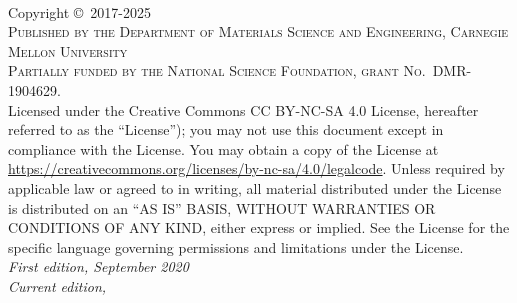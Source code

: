 
\newpage
~\vfill
\thispagestyle{empty}

\noindent Copyright \copyright\ 2017-2025\\ %

\noindent \textsc{Published by the Department of Materials Science and Engineering, Carnegie Mellon University}\\ %

\noindent \textsc{Partially funded by the National Science Foundation, grant No.\ DMR-1904629.}\\ 


\noindent Licensed under the Creative Commons CC BY-NC-SA 4.0 License, hereafter referred to as the ``License''); you may not
use this document except in compliance with the License. You may obtain a copy
of the License at \url{https://creativecommons.org/licenses/by-nc-sa/4.0/legalcode}. Unless
required by applicable law or agreed to in writing, all material distributed
under the License is distributed on an ``AS IS'' BASIS, WITHOUT
WARRANTIES OR CONDITIONS OF ANY KIND, either express or implied. See the
License for the specific language governing permissions and limitations
under the License.\\ %

\noindent \textit{First edition, September 2020}\\ %
\noindent \textit{Current edition, \monthyear}


\pagestyle{empty} %
\tableofcontents %
\cleardoublepage %
\pagestyle{fancy} %

%
%


